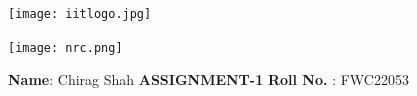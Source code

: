 \documentclass[10pt,a4paper]{report}
\begin{document}
\begin{figure*}[!tbp]
  \centering
  \begin{minipage}[b]{0.4\textwidth}
    \texttt{[image: iitlogo.jpg]}
  \end{minipage}
  \hfill
  \vspace{5mm}\begin{minipage}[b]{0.4\textwidth}
\raggedleft  \texttt{[image: nrc.png]}\

  \end{minipage}\vspace{0.2cm}
\end{figure*}
\raggedright \textbf{Name}:\hspace{1mm} Chirag Shah\hspace{3cm} \Large \textbf{ASSIGNMENT-1}\hspace{2.5cm} %
\normalsize \textbf{Roll No.} :\hspace{1mm} FWC22053\vspace{1cm}
\end{document}
